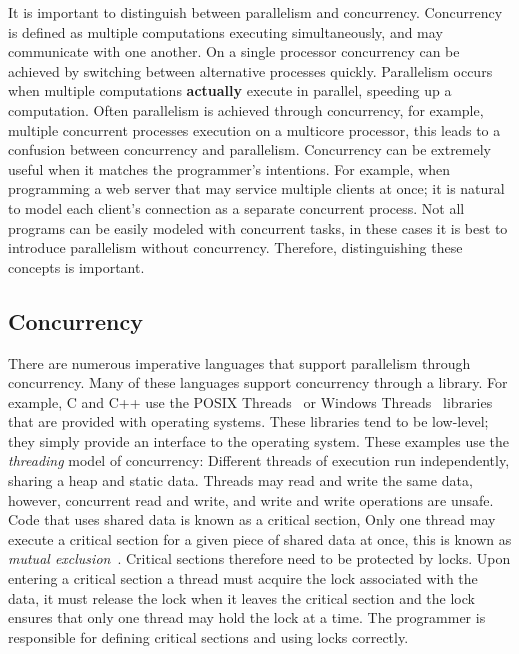 
%

It is important to distinguish between parallelism and concurrency.
Concurrency is defined as multiple computations executing simultaneously,
and may communicate with one another.
On a single processor concurrency can be achieved by switching between
alternative processes quickly.
Parallelism occurs when multiple computations \textbf{actually} execute in parallel,
speeding up a computation.
Often parallelism is achieved through concurrency,
for example, multiple concurrent processes execution on a multicore processor,
this leads to a confusion between concurrency and parallelism.
Concurrency can be extremely useful when it matches the programmer's intentions.
For example,
when programming a web server that may service multiple clients at once;
it is natural to model each client's connection as a separate concurrent process.
Not all programs can be easily modeled with concurrent tasks,
in these cases it is best to introduce parallelism without concurrency.
Therefore, distinguishing these concepts is important.

\subsection{Concurrency}
\label{sec:backgnd_concurrency}

There are numerous imperative languages that support parallelism through
concurrency.
Many of these languages support concurrency through a library.
For example, 
C and C++ use the POSIX Threads~\cite{pthreads} or Windows
Threads~\cite{winthreads} libraries that are provided with operating systems.
These libraries tend to be low-level;
they simply provide an interface to the operating system.
These examples use the \emph{threading} model of concurrency:
Different threads of execution run independently,
sharing a heap and static data.
Threads may read and write the same data,
however,
concurrent read and write, and write and write operations are unsafe.
Code that uses shared data is known as a critical section,
Only one thread may execute a critical section for a given piece of shared data
at once,
this is known as \emph{mutual exclusion}~\cite{dijkstra:mutex}.
Critical sections therefore need to be protected by locks.
Upon entering a critical section a thread must acquire the lock associated with
the data,
it must release the lock when it leaves the critical section and the lock
ensures that only one thread may hold the lock at a time.
The programmer is responsible for defining critical sections and using locks
correctly.

